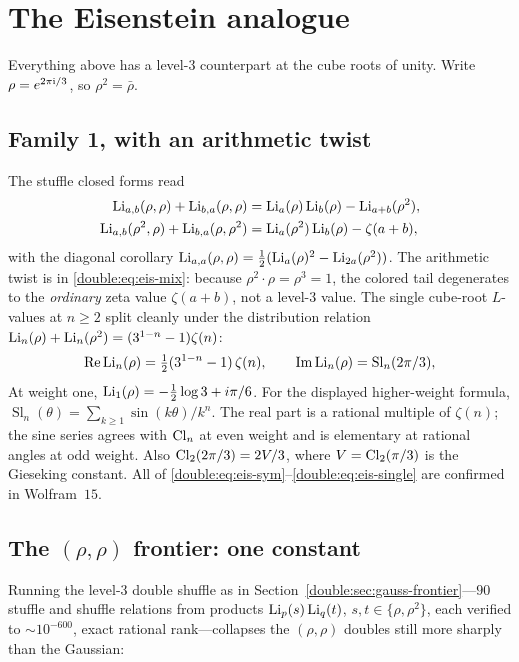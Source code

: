 \section{The Eisenstein analogue}\label{double:sec:eisenstein}

Everything above has a level-$3$ counterpart at the cube roots of unity. Write
$\rho=e^{2\pi\mathrm{i}/3}$, so $\rho^2=\bar\rho$.

\subsection{Family 1, with an arithmetic twist}

The stuffle closed forms read
\begin{align}
  \operatorname{Li}_{a,b}(\rho,\rho)+\operatorname{Li}_{b,a}(\rho,\rho)     &=\operatorname{Li}_a(\rho)\operatorname{Li}_b(\rho)-\operatorname{Li}_{a+b}(\rho^2),
     \label{double:eq:eis-sym}\\
  \operatorname{Li}_{a,b}(\rho^2,\rho)+\operatorname{Li}_{b,a}(\rho,\rho^2) &=\operatorname{Li}_a(\rho^2)\operatorname{Li}_b(\rho)-\zeta(a+b),
     \label{double:eq:eis-mix}
\end{align}
with the diagonal corollary $\operatorname{Li}_{a,a}(\rho,\rho)=\tfrac12(\operatorname{Li}_a(\rho)^2-\operatorname{Li}_{2a}(\rho^2))$. The
arithmetic twist is in \eqref{double:eq:eis-mix}: because $\rho^2\cdot\rho=\rho^3=1$, the colored tail
degenerates to the \emph{ordinary} zeta value $\zeta(a+b)$, not a level-$3$ value. The single
cube-root $L$-values at $n\ge2$ split cleanly under the distribution relation
$\operatorname{Li}_n(\rho)+\operatorname{Li}_n(\rho^2)=(3^{1-n}-1)\zeta(n)$:
\begin{equation}\label{double:eq:eis-single}
  \operatorname{Re}\operatorname{Li}_n(\rho)=\tfrac12(3^{1-n}-1)\,\zeta(n),\qquad
  \operatorname{Im}\operatorname{Li}_n(\rho)=\operatorname{Sl}_n(2\pi/3),
\end{equation}
At weight one, $\operatorname{Li}_1(\rho)=-\frac12\log3+i\pi/6$. For the displayed higher-weight formula, $\operatorname{Sl}_n(\theta)=\sum_{k\ge1}\sin(k\theta)/k^n$.
The real part is a rational multiple of $\zeta(n)$; the sine series agrees
with $\operatorname{Cl}_n$ at even weight and is elementary at rational angles at odd
weight. Also $\operatorname{Cl}_2(2\pi/3)=2V/3$, where $V=\operatorname{Cl}_2(\pi/3)$ is the
Gieseking constant. All
of \eqref{double:eq:eis-sym}--\eqref{double:eq:eis-single} are confirmed in Wolfram~$15$.

\subsection{The $(\rho,\rho)$ frontier: one constant}

Running the level-$3$ double shuffle as in Section~\ref{double:sec:gauss-frontier}---$90$ stuffle and shuffle
relations from products $\operatorname{Li}_p(s)\operatorname{Li}_q(t)$, $s,t\in\{\rho,\rho^2\}$, each verified to
${\sim}10^{-600}$, exact rational rank---collapses the $(\rho,\rho)$ doubles still more sharply than
the Gaussian:

